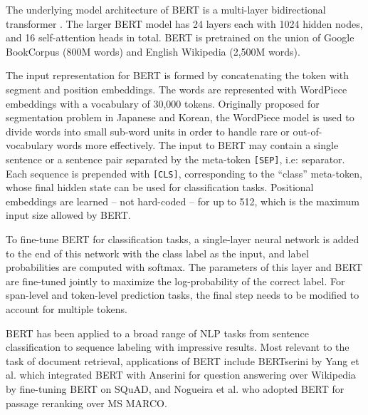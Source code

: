 The underlying model architecture of BERT is a multi-layer bidirectional transformer \cite{vaswani2017attention}.
The larger BERT model has 24 layers each with 1024 hidden nodes, and 16 self-attention heads in total.
BERT is pretrained on the union of Google BookCorpus \cite{zhu2015aligning} (800M words) and English Wikipedia (2,500M words).

The input representation for BERT is formed by concatenating the token with segment and position embeddings.
The words are represented with WordPiece embeddings \cite{wu2016google} with a vocabulary of 30,000 tokens.
Originally proposed for segmentation problem in Japanese and Korean, the WordPiece model is used to divide words into small sub-word units in order to handle rare or out-of-vocabulary words more effectively.
The input to BERT may contain a single sentence or a sentence pair separated by the meta-token \texttt{[SEP]}, i.e: separator.
Each sequence is prepended with \texttt{[CLS]}, corresponding to the ``class'' meta-token, whose final hidden state can be used for classification tasks.
Positional embeddings are learned -- not hard-coded -- for up to 512, which is the maximum input size allowed by BERT.

To fine-tune BERT for classification tasks, a single-layer neural network is added to the end of this network with the class label as the input, and label probabilities are computed with softmax.
The parameters of this layer and BERT are fine-tuned jointly to maximize the log-probability of the correct label.
For span-level and token-level prediction tasks, the final step needs to be modified to account for multiple tokens.

BERT has been applied to a broad range of NLP tasks from sentence classification to sequence labeling with impressive results.
Most relevant to the task of document retrieval, applications of BERT include BERTserini by Yang et al. \cite{yang2019end} which integrated BERT with Anserini for question answering over Wikipedia by fine-tuning BERT on SQuAD, and Nogueira et al. \cite{nogueira2019passage} who adopted BERT for passage reranking over MS MARCO.

